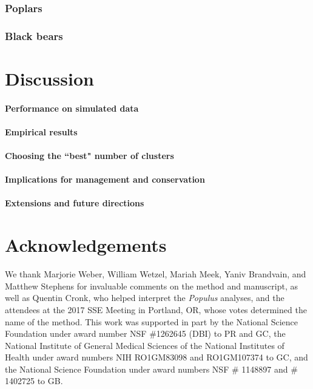 \documentclass[12pt]{article}
\begin{document}
\subsubsection*{Poplars}

\subsubsection*{Black bears}

\section*{Discussion}

\paragraph{Performance on simulated data}
\paragraph{Empirical results}
\paragraph{Choosing the ``best" number of clusters}
\paragraph{Implications for management and conservation}
\paragraph{Extensions and future directions}

\section*{Acknowledgements}

We thank Marjorie Weber, William Wetzel, Mariah Meek, Yaniv Brandvain, and Matthew Stephens 
for invaluable comments on the method and manuscript, 
as well as Quentin Cronk, who helped interpret the \textit{Populus} analyses, 
and the attendees at the 2017 SSE Meeting in Portland, OR, whose votes determined the name of the method.
This work was supported in part by 
the National Science Foundation under award number NSF \#1262645 (DBI) to PR and GC, 
the National Institute of General Medical Sciences of the National Institutes of Health under award numbers NIH RO1GM83098 and RO1GM107374 to GC,
and the National Science Foundation under award numbers NSF \# 1148897 and \# 1402725 to GB.
\end{document}
